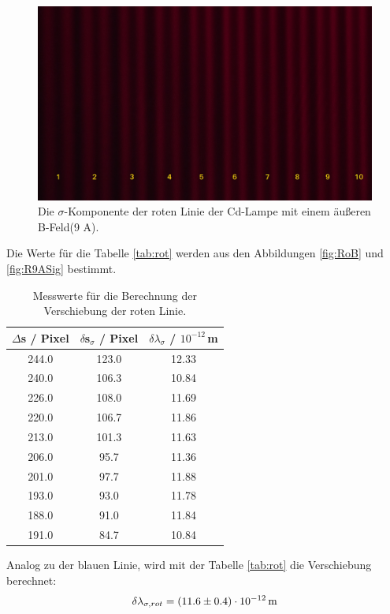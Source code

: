 \begin{figure}[H]
  \centering
  \includegraphics[width=0.8\linewidth]{Bilder/R9ASig.JPG}
  \caption{Die $\sigma$-Komponente der roten Linie der Cd-Lampe mit einem äußeren B-Feld(9 A).}
  \label{fig:R9ASig}
\end{figure}

Die Werte für die Tabelle \eqref{tab:rot} werden aus den Abbildungen \eqref{fig:RoB} und \eqref{fig:R9ASig} bestimmt.

\begin{table}[H]
  \centering
  \caption{Messwerte für die Berechnung der Verschiebung der roten Linie.}
  \label{tab:rot}
  \begin{tabular}{c c c}
    $\Delta$s / Pixel & $\delta$s$_{\sigma}$ / Pixel & $\delta \lambda_{\sigma}$ / $10^{-12}$\,m \\
    \hline
    244.0 & 123.0 & 12.33 \\
    240.0 & 106.3 & 10.84 \\
    226.0 & 108.0 & 11.69 \\
    220.0 & 106.7 & 11.86 \\
    213.0 & 101.3 & 11.63 \\
    206.0 & 95.7  & 11.36 \\
    201.0 & 97.7  & 11.88 \\
    193.0 & 93.0  & 11.78 \\
    188.0 & 91.0  & 11.84 \\
    191.0 & 84.7  & 10.84 \\
    \hline
  \end{tabular}
\end{table}

Analog zu der blauen Linie, wird mit der Tabelle \eqref{tab:rot} die Verschiebung berechnet:
\begin{align*}
  \delta \lambda_{\sigma,rot} = (\num{11.6 +- 0.4})\cdot 10^{-12}\,\text{m} \\
\end{align*}


